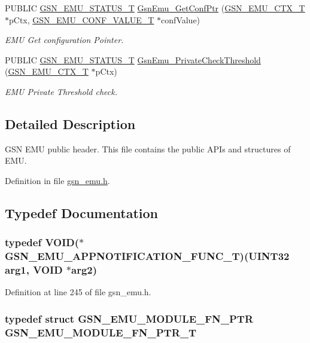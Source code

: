 \begin{DoxyCompactItemize}
PUBLIC \hyperlink{a00490_aeda27e2bd7f74b1b9748e313d272033e}{GSN\_\-EMU\_\-STATUS\_\-T} \hyperlink{a00663_ga3ab0982e59d704aec080c1752221c1ec}{GsnEmu\_\-GetConfPtr} (\hyperlink{a00059}{GSN\_\-EMU\_\-CTX\_\-T} $\ast$pCtx, \hyperlink{a00058}{GSN\_\-EMU\_\-CONF\_\-VALUE\_\-T} $\ast$confValue)
\begin{DoxyCompactList}\small\item\em EMU Get configuration Pointer. \end{DoxyCompactList}\item 
PUBLIC \hyperlink{a00490_aeda27e2bd7f74b1b9748e313d272033e}{GSN\_\-EMU\_\-STATUS\_\-T} \hyperlink{a00663_ga898954cb12a09a8b232591d909aa3f93}{GsnEmu\_\-PrivateCheckThreshold} (\hyperlink{a00059}{GSN\_\-EMU\_\-CTX\_\-T} $\ast$pCtx)
\begin{DoxyCompactList}\small\item\em EMU Private Threshold check. \end{DoxyCompactList}\end{DoxyCompactItemize}


\subsection{Detailed Description}
GSN EMU public header. This file contains the public APIs and structures of EMU. 

Definition in file \hyperlink{a00489_source}{gsn\_\-emu.h}.



\subsection{Typedef Documentation}
\hypertarget{a00489_ab0fa7e48e947d0a8dd37314d7aee6ba7}{
\subsubsection[{GSN\_\-EMU\_\-APPNOTIFICATION\_\-FUNC\_\-T}]{\setlength{\rightskip}{0pt plus 5cm}typedef VOID($\ast$  {\bf GSN\_\-EMU\_\-APPNOTIFICATION\_\-FUNC\_\-T})({\bf UINT32} arg1, VOID $\ast$arg2)}}
\label{a00489_ab0fa7e48e947d0a8dd37314d7aee6ba7}


Definition at line 245 of file gsn\_\-emu.h.

\hypertarget{a00489_a93b7b6a5c3db3b4f85b0825b96f47ab4}{
\subsubsection[{GSN\_\-EMU\_\-MODULE\_\-FN\_\-PTR\_\-T}]{\setlength{\rightskip}{0pt plus 5cm}typedef struct {\bf GSN\_\-EMU\_\-MODULE\_\-FN\_\-PTR}  {\bf GSN\_\-EMU\_\-MODULE\_\-FN\_\-PTR\_\-T}}}
\label{a00489_a93b7b6a5c3db3b4f85b0825b96f47ab4}


